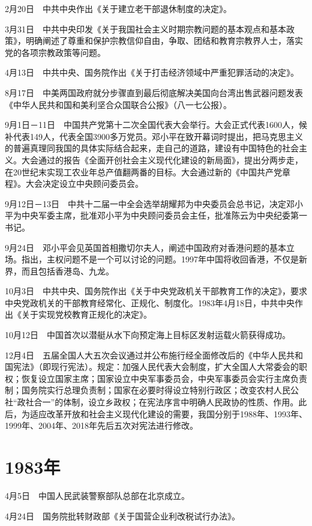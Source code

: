 \documentclass[10pt,a4paper,twocolumn]{book}
\begin{document}
2月20日　中共中央作出《关于建立老干部退休制度的决定》。

3月31日　中共中央印发《关于我国社会主义时期宗教问题的基本观点和基本政策》，明确阐述了尊重和保护宗教信仰自由，争取、团结和教育宗教界人士，落实党的各项宗教政策等问题。

4月13日　中共中央、国务院作出《关于打击经济领域中严重犯罪活动的决定》。

8月17日　中美两国政府就分步骤直到最后彻底解决美国向台湾出售武器问题发表《中华人民共和国和美利坚合众国联合公报》（八一七公报）。

9月1日－11日　中国共产党第十二次全国代表大会举行。大会正式代表1600人，候补代表149人，代表全国3900多万党员。邓小平在致开幕词时提出，把马克思主义的普遍真理同我国的具体实际结合起来，走自己的道路，建设有中国特色的社会主义。大会通过的报告《全面开创社会主义现代化建设的新局面》，提出分两步走，在20世纪末实现工农业年总产值翻两番的目标。大会通过新的《中国共产党章程》。大会决定设立中央顾问委员会。

9月12日－13日　中共十二届一中全会选举胡耀邦为中央委员会总书记，决定邓小平为中央军委主席，批准邓小平为中央顾问委员会主任，批准陈云为中央纪委第一书记。

9月24日　邓小平会见英国首相撒切尔夫人，阐述中国政府对香港问题的基本立场。指出，主权问题不是一个可以讨论的问题。1997年中国将收回香港，不仅是新界，而且包括香港岛、九龙。

10月3日　中共中央、国务院作出《关于中央党政机关干部教育工作的决定》，要求中央党政机关的干部教育经常化、正规化、制度化。1983年4月18日，中共中央作出《关于实现党校教育正规化的决定》。

10月12日　中国首次以潜艇从水下向预定海上目标区发射运载火箭获得成功。

12月4日　五届全国人大五次会议通过并公布施行经全面修改后的《中华人民共和国宪法》（即现行宪法）。规定：加强人民代表大会制度，扩大全国人大常委会的职权；恢复设立国家主席；国家设立中央军事委员会，中央军事委员会实行主席负责制；国务院实行总理负责制；国家在必要时得设立特别行政区；改变农村人民公社“政社合一”的体制，设立乡政权；在宪法序言中明确人民政协的性质、作用。此后，为适应改革开放和社会主义现代化建设的需要，我国分别于1988年、1993年、1999年、2004年、2018年先后五次对宪法进行修改。

\section{1983年}

4月5日　中国人民武装警察部队总部在北京成立。

4月24日　国务院批转财政部《关于国营企业利改税试行办法》。
\end{document}
